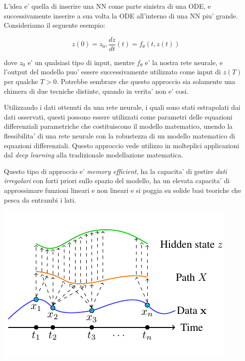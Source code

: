 L'idea e' quella di inserire una NN come parte sinistra di una ODE, 
e successivamente inserire a sua volta la ODE all'interno di una NN 
piu' grande. Consideriamo il seguente esempio:

$$z(0) = z_0, \frac{dz}{dt}(t) = f_\theta(t,z(t))$$

dove $z_0$ e' un qualsiasi tipo di input, mentre $f_\theta$ e' la nostra rete
neurale, e l'output del modello puo' essere successivamente utilizzato come 
input di $z(T)$ per qualche $T > 0$. Potrebbe sembrare che questo approccio sia
solamente una chimera di due tecniche distinte, quando in verita' non e' cosi. 

Utilizzando i dati ottenuti da una rete neurale, i quali sono stati estrapolati 
dai dati osservati, questi possono essere utilizzati come parametri delle equazioni
differenziali parametriche che costituiscono il modello matematico, unendo la 
flessibilita' di una rete neurale con la robustezza di un modello matematico 
di equazioni differenziali. Questo approccio vede utilizzo in molteplici applicazioni
dal \emph{deep learning} alla tradizionale modellazione matematica. 

Questo tipo di approccio e' \emph{memory efficient}, ha la capacita' di gestire
\emph{dati irregolari} con forti priori sullo spazio del modello, ha un elevata
capacita' di approssimare funzioni lineari e non lineari e si poggia su solide basi 
teoriche che pesca da entrambi i lati.

\begin{minipage}{\linewidth}
    \centering
    \includegraphics[width=\textwidth]{img/maths-oxford-ml-nde_0.png}
    \label{fig:NDE_example}
\end{minipage}

